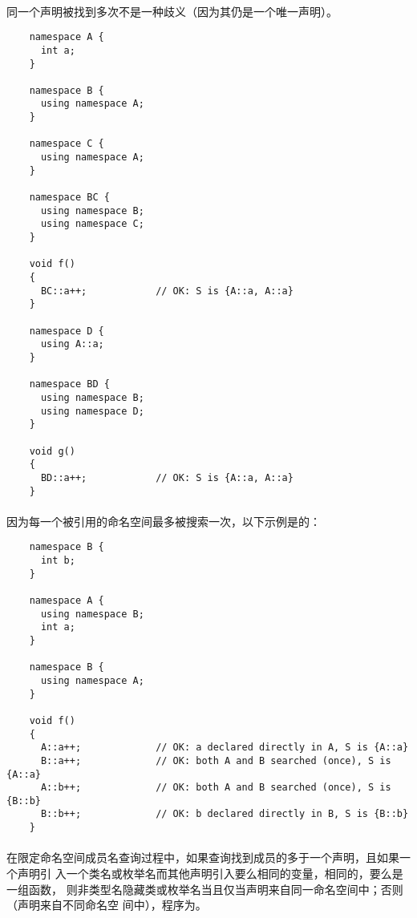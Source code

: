 \paragraph{} %
\begin{note}
  同一个声明被找到多次不是一种歧义（因为其仍是一个唯一声明）。

  \begin{example}
    \begin{lstlisting}
    namespace A {
      int a;
    }

    namespace B {
      using namespace A;
    }

    namespace C {
      using namespace A;
    }

    namespace BC {
      using namespace B;
      using namespace C;
    }

    void f()
    {
      BC::a++;            // OK: S is {A::a, A::a}
    }

    namespace D {
      using A::a;
    }

    namespace BD {
      using namespace B;
      using namespace D;
    }

    void g()
    {
      BD::a++;            // OK: S is {A::a, A::a}
    }
    \end{lstlisting}
  \end{example}

\end{note}

\paragraph{} %
\begin{example}
  因为每一个被引用的命名空间最多被搜索一次，以下示例是\wellform{}的：
  \begin{lstlisting}
    namespace B {
      int b;
    }

    namespace A {
      using namespace B;
      int a;
    }

    namespace B {
      using namespace A;
    }

    void f()
    {
      A::a++;             // OK: a declared directly in A, S is {A::a}
      B::a++;             // OK: both A and B searched (once), S is {A::a}
      A::b++;             // OK: both A and B searched (once), S is {B::b}
      B::b++;             // OK: b declared directly in B, S is {B::b}
    }
  \end{lstlisting}
\end{example}

\paragraph{} %
在限定命名空间成员名查询过程中，如果查询找到成员的多于一个声明，且如果一个声明引
入一个类名或枚举名而其他声明引入要么相同的变量，相同的\enumr{}，要么是一组函数，
则非类型名隐藏类或枚举名当且仅当声明来自同一命名空间中；否则（声明来自不同命名空
间中），程序为\illform{}。

